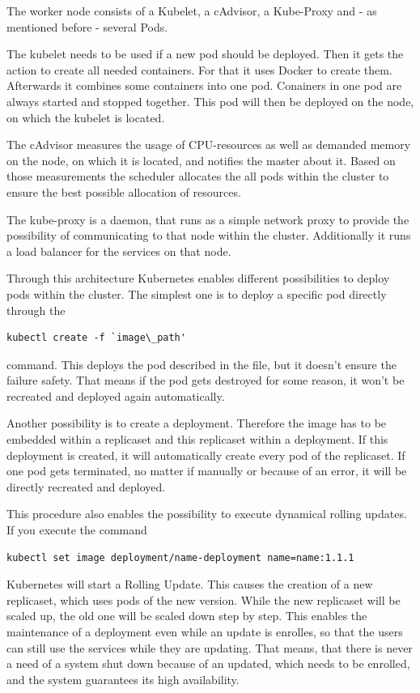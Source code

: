 The worker node consists of a Kubelet, a cAdvisor, a Kube-Proxy and - as mentioned before - several Pods. 

The kubelet needs to be used if a new pod should be deployed. Then it gets the action to create all needed containers. For that it uses Docker to create them. Afterwards it combines some containers into one pod. Conainers in one pod are always started and stopped together. This pod will then be deployed on the node, on which the kubelet is located.

The cAdvisor measures the usage of CPU-resources as well as demanded memory on the node, on which it is located, and notifies the master about it. Based on those measurements the scheduler allocates the all pods within the cluster to ensure the best possible allocation of resources.

The kube-proxy is a daemon, that runs as a simple network proxy to provide the possibility of communicating to that node within the cluster. Additionally it runs a load balancer for the services on that node.

Through this architecture Kubernetes enables different possibilities to deploy pods within the cluster. The simplest one is to deploy a specific pod directly through the 
\begin{lstlisting}
kubectl create -f `image\_path'
\end{lstlisting}
command. This deploys the pod described in the file, but it doesn't ensure the failure safety. That means if the pod gets destroyed for some reason, it won't be recreated and deployed again automatically. 


Another possibility is to create a deployment. Therefore the image has to be embedded within a replicaset and this replicaset within a deployment. If this deployment is created, it will automatically create every pod of the replicaset. If one pod gets terminated, no matter if manually or because of an error, it will be directly recreated and deployed.

This procedure also enables the possibility to execute dynamical rolling updates. If you execute the command
\begin{lstlisting}
kubectl set image deployment/name-deployment name=name:1.1.1
\end{lstlisting}
Kubernetes will start a Rolling Update. This causes the creation of a new replicaset, which uses pods of the new version. While the new replicaset will be scaled up, the old one will be scaled down step by step. This enables the maintenance of a deployment even while an update is enrolles, so that the users can still use the services while they are updating. That means, that there is never a need of a system shut down because of an updated, which needs to be enrolled, and the system guarantees its high availability.

